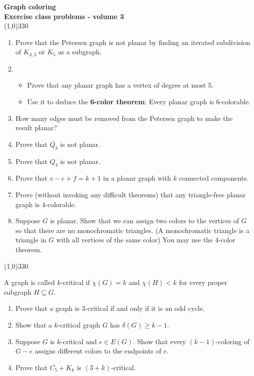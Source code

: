 \documentclass[a4paper]{article}
\begin{document}
\pagestyle{empty}
\begin{center}
	{\Large\bf Graph coloring}\\
	{\large\bf Exercise class problems - volume 3}\\
	\line(1,0){330}
\end{center}

\begin{enumerate}
\item Prove that the Petersen graph is not planar by finding an iterated subdivision of $K_{3,3}$ or $K_5$ as a subgraph.
\item 
\begin{itemize}
\item Prove that any planar graph has a vertex of degree at most $5$.
\item Use it to deduce the \textbf{6-color theorem}: Every planar graph is $6$-colorable.
\end{itemize}
\item How many edges must be removed from the Petersen graph to make the result planar?
\item Prove that $\overline{Q_3}$ is not planar.
\item Prove that $Q_4$ is not planar.
\item Prove that $v-e+f=k+1$ in a planar graph with $k$ connected components.
\item Prove (without invoking any difficult theorems) that any triangle-free planar graph is $4$-colorable.
\item Suppose $G$ is planar. Show that we can assign two colors to the vertices of $G$ so that there are no monochromatic triangles. (A monochromatic triangle is a triangle in $G$ with all vertices of the same color) You may use the $4$-color theorem.
\end{enumerate}

\begin{center}
	\line(1,0){330}
\end{center}
	
A graph is called $k$-critical if $\chi(G)=k$ and $\chi(H)<k$ for every proper subgraph $H\subseteq G$.

\begin{enumerate}
\item Prove that a graph is $3$-critical if and only if it is an odd cycle.
\item Show that a $k$-critical graph $G$ has $\delta(G)\geq k-1$.
\item Suppose $G$ is $k$-critical and $e\in E(G)$. Show that every $(k-1)$-coloring of $G-e$ assigns different colors to the endpoints of $e$.
\item Prove that $C_5+K_k$ is $(3+k)$-critical.
\end{enumerate}
	
\end{document}

